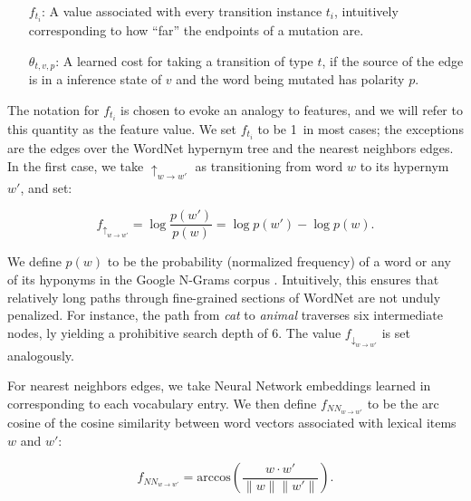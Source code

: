 \vspace{-0.25em}
\begin{itemize}
  \indentitem\item[$f_{t_i}$:]
    A value associated with every transition instance $t_i$, intuitively
      corresponding to how ``far'' the endpoints of a mutation are.
  \indentitem\item[$\theta_{t,v,p}$:]
    A learned cost for taking a transition of type $t$, if the source
    of the edge is in a inference state of $v$ and the word being mutated
    has polarity $p$.
\end{itemize}
\vspace{-0.25em}

The notation for $f_{t_i}$ is chosen to evoke an analogy to features,
  and we will refer to this quantity as the feature value.
We set $f_{t_i}$ to be 1\ in most cases;
  the exceptions are the edges over the WordNet hypernym tree
  and the nearest neighbors edges.
In the first case, we take $\uparrow_{w \rightarrow w'}$ as transitioning
  from word $w$ to its hypernym $w'$, and set:

\vspace{-0.5em}
\begin{equation*}
  f_{\uparrow_{w \rightarrow w'}}   = \log \frac{p(w')}{p(w)} = \log p(w') - \log p(w).
\end{equation*}
\vspace{-0.5em}

We define $p(w)$ to be the probability (normalized frequency)
  of a word or any of its hyponyms in the Google N-Grams corpus
  \cite{key:2006brants-ngrams}.
Intuitively, this ensures that relatively long paths through fine-grained
  sections of WordNet are not unduly penalized.
For instance, the path from \textit{cat} to \textit{animal} traverses
  six intermediate nodes, \naive ly yielding a prohibitive
  search depth of 6.
The value $f_{\downarrow_{w \rightarrow w'}}$ is set analogously.

For nearest neighbors edges, we take Neural Network embeddings learned
  in  corresponding to each vocabulary entry.
We then define $f_{NN_{w \rightarrow w'}}$
  to be the arc cosine of the cosine similarity between word vectors
  associated with lexical items $w$ and $w'$:

\vspace{-0.5em}
\begin{equation*}
  f_{NN_{w \rightarrow w'}}
    = \textrm{arccos} \left( \frac{w \cdot w'}{\|w\| \|w'\|} \right).
\end{equation*}
\vspace{-0.5em}

